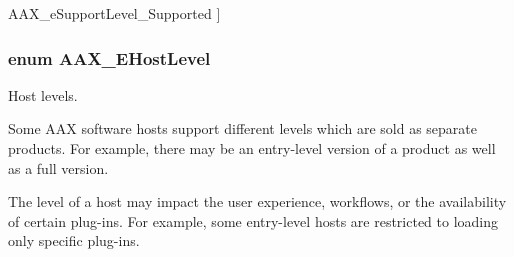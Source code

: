 \begin{Desc}
\begin{description}
{\hypertarget{a00206_aca7bf42860665d5da66f4ac342e761b3adcad8c3462eb1f37cbd6525608c5a475}{}A\+A\+X\+\_\+e\+Support\+Level\+\_\+\+Supported\label{a00206_aca7bf42860665d5da66f4ac342e761b3adcad8c3462eb1f37cbd6525608c5a475}
}]\item[{\em 
\hypertarget{a00206_aca7bf42860665d5da66f4ac342e761b3ab6a4f0a0ab04481d4279010e8eaf6e09}{}A\+A\+X\+\_\+e\+Support\+Level\+\_\+\+Disabled\label{a00206_aca7bf42860665d5da66f4ac342e761b3ab6a4f0a0ab04481d4279010e8eaf6e09}
}]\item[{\em 
\hypertarget{a00206_aca7bf42860665d5da66f4ac342e761b3ac7b3a489a9972ac6f16b7c7763706fee}{}A\+A\+X\+\_\+e\+Support\+Level\+\_\+\+By\+Property\label{a00206_aca7bf42860665d5da66f4ac342e761b3ac7b3a489a9972ac6f16b7c7763706fee}
}]\end{description}
\end{Desc}
\hypertarget{a00206_a2d34e7a7c2e6f4f6361555ad02869219}{}
\subsubsection[{A\+A\+X\+\_\+\+E\+Host\+Level}]{\setlength{\rightskip}{0pt plus 5cm}enum {\bf A\+A\+X\+\_\+\+E\+Host\+Level}}\label{a00206_a2d34e7a7c2e6f4f6361555ad02869219}


Host levels. 

Some A\+A\+X software hosts support different levels which are sold as separate products. For example, there may be an entry-\/level version of a product as well as a full version.

The level of a host may impact the user experience, workflows, or the availability of certain plug-\/ins. For example, some entry-\/level hosts are restricted to loading only specific plug-\/ins.

